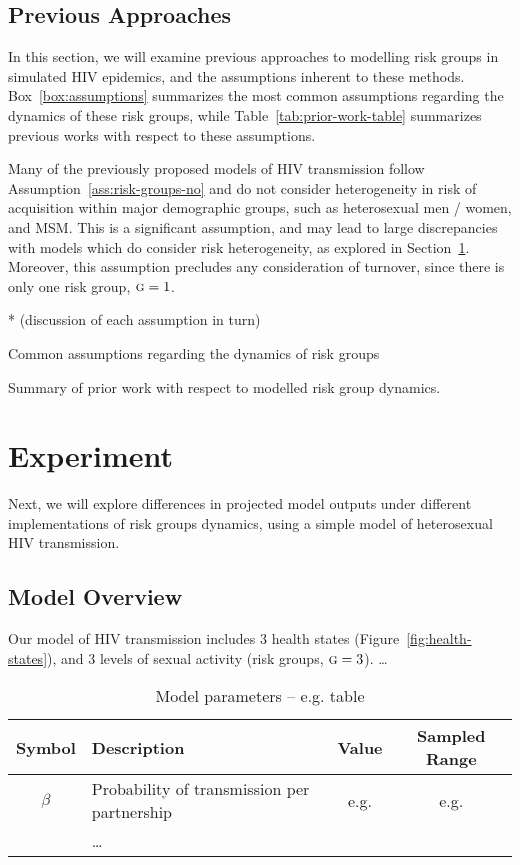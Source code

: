 \documentclass{article}
\numberwithin{equation}{section}
\newcommand{\G}{\textsc{g}}
\begin{document}
\subsection{Previous Approaches}
In this section, we will examine previous approaches to modelling
risk groups in simulated HIV epidemics,
and the assumptions inherent to these methods.
Box~\ref{box:assumptions} summarizes
the most common assumptions regarding the dynamics of these risk groups,
while Table~\ref{tab:prior-work-table} summarizes previous works
with respect to these assumptions.
\par
Many of the previously proposed models of HIV transmission
follow Assumption~\ref{ass:risk-groups-no} and do not consider heterogeneity
in risk of acquisition within major demographic groups,
such as heterosexual men / women, and MSM.
This is a significant assumption,
and may lead to large discrepancies with models which do consider risk heterogeneity,
as explored in Section~\ref{s:exp}.
Moreover, this assumption precludes any consideration of turnover,
since there is only one risk group, $\G = 1$.
\par
* (discussion of each assumption in turn)
\begin{floatbox}
  \caption{Common assumptions regarding the dynamics of risk groups}
  \label{box:assumptions}
  
\end{floatbox}
\begin{table}
  \centering
  \caption{Summary of prior work with respect to modelled risk group dynamics.}
  \label{tab:prior-work-table}
  
\end{table}
\clearpage
\section{Experiment}\label{s:exp}
Next, we will explore differences in projected model outputs
under different implementations of risk groups dynamics,
using a simple model of heterosexual HIV transmission.
\subsection{Model Overview}
Our model of HIV transmission includes 3 health states (Figure~\ref{fig:health-states}),
and 3 levels of sexual activity (risk groups, $\G = 3$).
\dots
\begin{table}
  \centering\caption{Model parameters -- e.g. table}
  \label{tab:model-params}
  \begin{tabular}{clcc}
  	\toprule
  	Symbol  & Description                                 & Value & Sampled Range \\
  	\midrule
  	$\beta$ & Probability of transmission per partnership & e.g.  & e.g. \\
  	        & \dots                                       &       & \\
  	\bottomrule
  \end{tabular}
\end{table}
\end{document}
